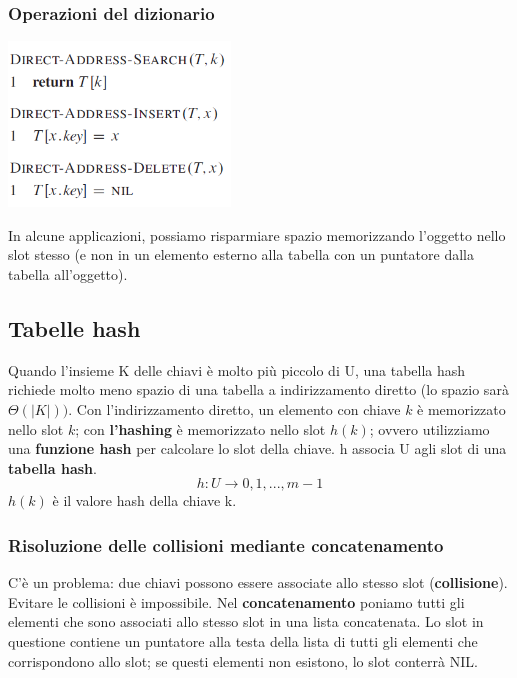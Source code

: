 \documentclass[11pt,a4paper]{article}
\begin{document}
\subsubsection{Operazioni del dizionario}
\begin{center}
      \includegraphics[scale=0.7]{img/dizionario.png}
\end{center}
In alcune applicazioni, possiamo risparmiare spazio memorizzando l’oggetto nello slot stesso (e non in un
elemento esterno alla tabella con un puntatore dalla tabella all’oggetto).

\subsection{Tabelle hash}
Quando l’insieme K delle chiavi è molto più piccolo di U, una tabella hash richiede molto meno spazio di una
tabella a indirizzamento diretto (lo spazio sarà $\Theta(|K|))$.
Con l’indirizzamento diretto, un elemento con chiave $k$ è memorizzato nello slot $k$; con \textbf{l’hashing} è
memorizzato nello slot $h(k)$; ovvero utilizziamo una \textbf{funzione hash} per calcolare lo slot della chiave.
h associa U agli slot di una \textbf{tabella hash}.
\[h: U \rightarrow {0, 1, ..., m - 1}\]
$h(k)$ è il valore hash della chiave k.

\subsubsection{Risoluzione delle collisioni mediante concatenamento}
C’è un problema: due chiavi possono essere associate allo stesso slot (\textbf{collisione}). Evitare le collisioni è
impossibile.
Nel \textbf{concatenamento} poniamo tutti gli elementi che sono associati allo stesso slot in una lista concatenata. Lo
slot in questione contiene un puntatore alla testa della lista di tutti gli elementi che corrispondono allo slot;
se questi elementi non esistono, lo slot conterrà NIL.
\end{document}
